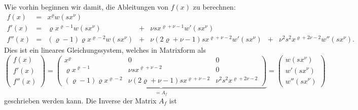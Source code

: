 Wie vorhin beginnen wir damit, die Ableitungen von $f(x)$ zu
berechnen:
\[
\renewcommand\arraycolsep{2pt}
\begin{array}{rcrcrcr}
f(x)   &=& x^\varrho w(sx^\nu)
       & &
       & &
\\
f'(x)  &=& \varrho x^{\varrho-1}   w(sx^\nu)
       &+& \nu s x^{\varrho+\nu-1} w'(sx^\nu)
       & &
\\
f''(x) &=& (\varrho-1)\varrho x^{\varrho-2}      w(sx^\nu)
       &+& \nu(2\varrho+\nu-1)sx^{\varrho+\nu-2} w'(sx^\nu)
       &+& \nu^2 s^2 x^{\varrho+2\nu-2}          w''(sx^\nu).
\end{array}
\]
Dies ist ein lineares Gleichungssystem, welches in Matrixform
als
\[
\begin{pmatrix}
f(x)\\
f'(x)\\
f''(x)
\end{pmatrix}
=
%
%
\underbrace{
\begin{pmatrix}
x^\varrho
	& 0
		& 0 \\
\varrho x^{\varrho-1}
	& \nu s x^{\varrho+\nu-2}
		& 0 \\
(\varrho-1)\varrho x^{\varrho-2}
	& \nu(2\varrho+\nu-1)sx^{\varrho+\nu-2}
		& \nu^2 s^2 x^{\varrho+2\nu-2}
\end{pmatrix}
}_{\displaystyle = A_f}
=
\begin{pmatrix}
w(sx^\nu)\\
w'(sx^\nu)\\
w''(sx^\nu)
\end{pmatrix}
\]
geschrieben werden kann.
Die Inverse der Matrix $A_f$ ist
